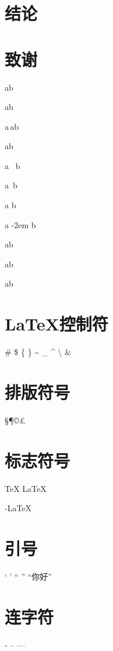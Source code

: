\documentclass[8pt]{article}
\begin{document}
	\section{结论}
	
	\section{致谢}
	
	 
	
	a\quad b
	
	a{\qquad}b
	
	a\,a\thinspace b
	
	a\enspace b
	
	a \ b
	
	a~b
	
	a\kern 6pc b
	
	a \kern -2em b
	
	a\hspace{35pt}b
	
	a\hphantom{xyz}b
	
	a\hfill b
	\section{\LaTeX 控制符}
	\# \$ \{ \} \~{} \_{} \^{} \textbackslash
	\&
	
	\section{排版符号}
	\S \P \dag \ddag \copyright \pounds
	
	
	\section{标志符号}
	\TeX{} \LaTeX{} \LaTeXe{}
	
	\XeLaTeX
	
	\METAFONT{} \MF{} \MP{}
	
	\AmSTeX{} \AmS-\LaTeX{}
	\BibTeX{} \LuaTeX{}
	
	
	\section{引号}
	` ' `` '' ``你好''
	
	
	\section{连字符}
	- -- ---
	
\end{document}
